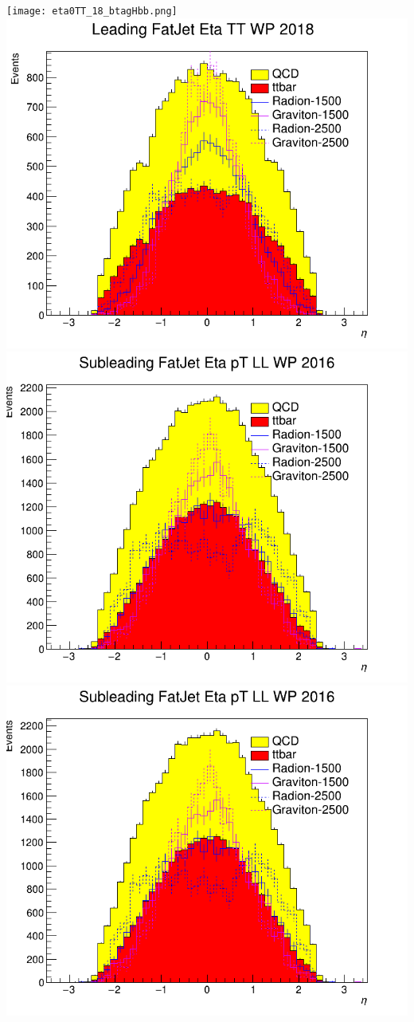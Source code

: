 \texttt{[image: eta0TT\_18\_btagHbb.png]}
\includegraphics[width=1\textwidth]{eta0TT_18_deepTagMD_HbbvsQCD.png}
\includegraphics[width=1\textwidth]{eta1LL_16_btagHbb.png}
\includegraphics[width=1\textwidth]{eta1LL_16_deepTagMD_HbbvsQCD.png}
